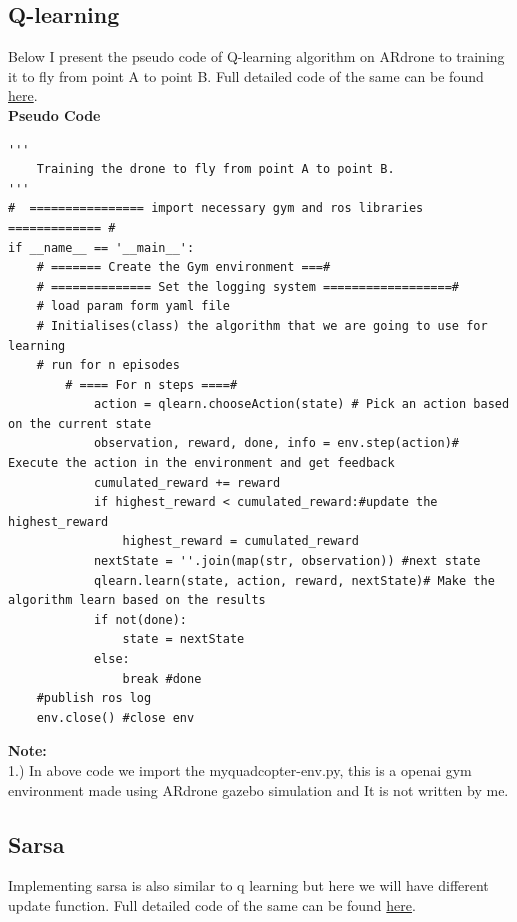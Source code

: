 \subsection{Q-learning}
Below I present the pseudo code of Q-learning algorithm on ARdrone to training it to fly from point A to point B. Full detailed code of the same can be found \href{https://github.com/iamrajee/Slam_and_RL_BTP/tree/master/code/AI/drone}{here}.\cite{rosject}\\

\textbf{Pseudo Code}
\begin{verbatim}
'''
    Training the drone to fly from point A to point B.
'''
#  ================ import necessary gym and ros libraries ============= #
if __name__ == '__main__':
    # ======= Create the Gym environment ===#
    # ============== Set the logging system ==================#
    # load param form yaml file
    # Initialises(class) the algorithm that we are going to use for learning
    # run for n episodes
        # ==== For n steps ====#
            action = qlearn.chooseAction(state) # Pick an action based on the current state
            observation, reward, done, info = env.step(action)# Execute the action in the environment and get feedback
            cumulated_reward += reward
            if highest_reward < cumulated_reward:#update the highest_reward
                highest_reward = cumulated_reward
            nextState = ''.join(map(str, observation)) #next state
            qlearn.learn(state, action, reward, nextState)# Make the algorithm learn based on the results
            if not(done):
                state = nextState
            else:
                break #done
    #publish ros log
    env.close() #close env

\end{verbatim}
\textbf{Note:}\\
1.) In above code we import the myquadcopter-env.py, this is a openai gym environment made using ARdrone gazebo simulation and It is not written by me.



\subsection{Sarsa}
Implementing sarsa is also similar to q learning but here we will have different update function. Full detailed code of the same can be found \href{https://github.com/iamrajee/Slam_and_RL_BTP/tree/master/code/AI/drone}{here}.\\

